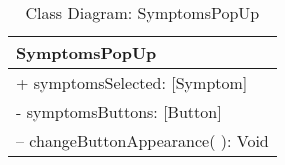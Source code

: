 \begin{table}[H]
\centering
\caption{Class Diagram: SymptomsPopUp}

\hspace{1em}
\renewcommand{\arraystretch}{1.7}

\begin{tabular}{|l|}
\hline
\textbf{SymptomsPopUp} \\
\hline
+ symptomsSelected: [Symptom] \\
- symptomsButtons: [Button] \\
\hdashline
– changeButtonAppearance( ): Void \\
\hline
\end{tabular}
\end{table}
